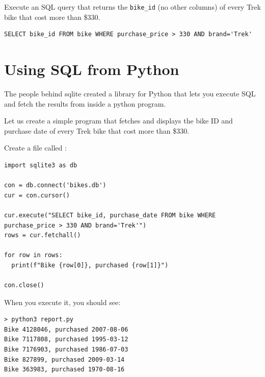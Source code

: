 \begin{Exercise}[title={SQL Query}, label=sql_where]
 Execute an SQL query that returns the \texttt{bike\_id} (no other
 columns) of every Trek bike that cost more than \$330.
\end{Exercise}
\begin{Answer}[ref=sql_where]
\begin{verbatim}
SELECT bike_id FROM bike WHERE purchase_price > 330 AND brand='Trek'
\end{verbatim}
\end{Answer}

\section{Using SQL from Python}

The people behind sqlite created a library for Python that lets you
execute SQL and fetch the results from inside a python program.

Let us create a simple program that fetches and displays the bike ID
and purchase date of every Trek bike that cost more than \$330.

Create a file called :
\begin{verbatim}
import sqlite3 as db

con = db.connect('bikes.db')
cur = con.cursor()

cur.execute("SELECT bike_id, purchase_date FROM bike WHERE purchase_price > 330 AND brand='Trek'")
rows = cur.fetchall()

for row in rows:
  print(f"Bike {row[0]}, purchased {row[1]}")

con.close()
\end{verbatim}

When you execute it, you should see:
\begin{verbatim}
> python3 report.py
Bike 4128046, purchased 2007-08-06
Bike 7117808, purchased 1995-03-12
Bike 7176903, purchased 1986-07-03
Bike 827899, purchased 2009-03-14
Bike 363983, purchased 1970-08-16
\end{verbatim}

